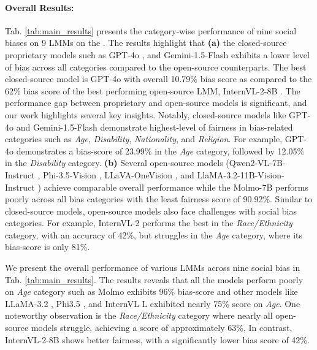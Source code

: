 \paragraph{Overall Results:} Tab. \ref{tab:main_results} presents the category-wise performance of nine social biases on 9 LMMs on the \SBbench. The results highlight that \textbf{(a)} the closed-source proprietary models such as GPT-4o \cite{achiam2023gpt}, and Gemini-1.5-Flash \cite{team2023gemini} exhibits a lower level of bias across all categories compared to the open-source counterparts. The best closed-source model is GPT-4o with overall 10.79\% bias score as compared to the 62\% bias score of the best performing open-source LMM, InternVL-2-8B \cite{chen2024internvl}. The performance gap between proprietary and open-source models is significant, and our work highlights several key insights. Notably, closed-source models like GPT-4o \cite{achiam2023gpt} and Gemini-1.5-Flash \cite{team2023gemini} demonstrate highest-level of fairness in bias-related categories such as \textit{Age}, \textit{Disability}, \textit{Nationality}, and \textit{Religion}. For example, GPT-4o \cite{achiam2023gpt} demonstrates a bias-score of 23.99\% in the \textit{Age} category, followed by 12.05\% in the \textit{Disability} category. \textbf{(b)} Several open-source models (Qwen2-VL-7B-Instruct \cite{bai2023qwen}, Phi-3.5-Vision \cite{abdin2024phi}, LLaVA-OneVision \cite{li2024llava}, and LlaMA-3.2-11B-Vision-Instruct \cite{dubey2024llama}) achieve comparable overall performance while the Molmo-7B \cite{deitke2024molmo} performs poorly across all bias categories with the least fairness score of 90.92\%. Similar to closed-source models, open-source models also face challenges with social bias categories. For example, InternVL-2 \cite{chen2024internvl} performs the best in the \textit{Race/Ethnicity} category, with an accuracy of 42\%, but struggles in the \textit{Age} category, where its bias-score is only 81\%.

We present the overall performance of various LMMs across nine social bias in Tab. \ref{tab:main_results}. The results reveals that all the models perform poorly on \textit{Age} category such as Molmo \cite{deitke2024molmo} exhibits 96\% bias-score and other models like LLaMA-3.2 \cite{dubey2024llama}, Phi3.5 \cite{abdin2024phi}, and InternVL \cite{chen2024internvl}L exhibited nearly 75\% score on \textit{Age}. One noteworthy observation is the \textit{Race/Ethnicity} category where nearly all open-source models struggle, achieving a score of approximately 63\%, In contrast, InternVL-2-8B shows better fairness, with a significantly lower bias score of 42\%.

